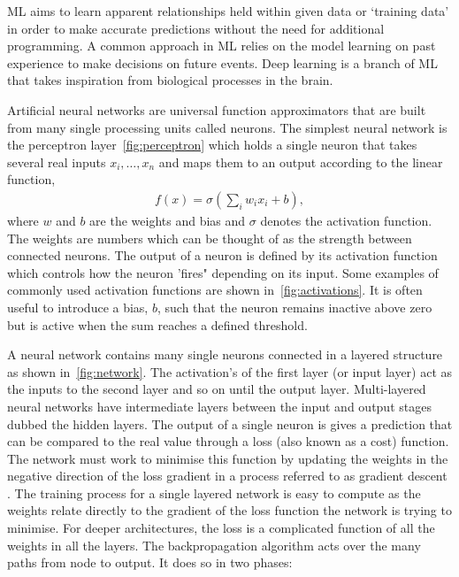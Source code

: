 \documentclass[12pt]{iopart}
\newcommand{\jordan}[1]{\textbf{\textcolor{red}{JORDAN: #1}}}
\newcommand{\chris}[1]{\textbf{\textcolor{green}{CHRIS: #1}}}
\begin{document}
\ac{ML} aims to learn apparent relationships held within given data or `training
data' in order to make accurate predictions without the need for additional
programming. A common approach in \ac{ML} relies on the model learning on
past experience to make decisions on future events. Deep learning is a branch of \ac{ML} that takes inspiration from biological processes in the brain. 

%

Artificial neural networks are universal function approximators that are built from many single
processing units called neurons. The simplest neural network is the perceptron
layer~\cref{fig:perceptron} which holds a single neuron that takes several real
inputs $x_{i},\ldots, x_{n}$
and maps them to an output according to the linear function, 
%
\begin{align}
f(x) = \sigma(\sum_i w_i x_i + b),
\label{eqn:neuron}
\end{align}
%
where $w$ and $b$ are the weights and bias and $\sigma$
denotes the activation function. The weights are numbers which can be thought
of as the strength between connected neurons. The output of a neuron is defined by its activation function which controls how the neuron 'fires" depending on its input. Some examples of commonly used activation functions are shown in~\cref{fig:activations}. It is often useful to introduce a bias, $b$, such that the neuron remains inactive
above zero but is active when the sum reaches a defined threshold. 

%
A neural network contains many single neurons connected in a layered structure
as shown in~\cref{fig:network}. The activation's of the first layer (or
input layer) act as the inputs to the second layer and so on until the output
layer. Multi-layered neural networks have intermediate layers between the input
and output stages dubbed the hidden layers.
%
The output of a single neuron is gives a
prediction that can be compared to the real value through a loss (also known as a
cost) function. The network must work to minimise this function by updating the weights in the negative
direction of the loss gradient in a process referred to as gradient
descent \cite{ruder2016overview}. The training process for a single layered network is easy to compute as the weights relate directly to the gradient of the loss function the network is trying to minimise. For deeper architectures, the loss is a complicated function of all the weights in all the layers. The backpropagation \cite{Nielsen1992} algorithm acts over the many paths from node to output. It does so in two phases:
\end{document}
